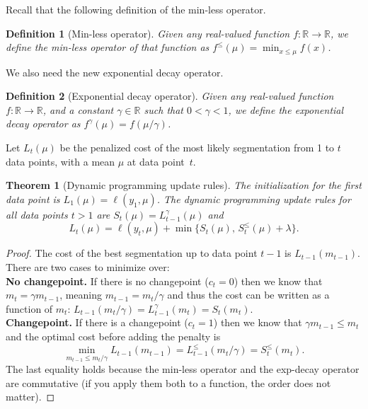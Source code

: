 \documentclass{article}
\newtheorem{theorem}{Theorem}
\newtheorem{definition}{Definition}
\newcommand{\RR}{\mathbb R}
\begin{document}
Recall that the following
definition of the min-less operator.
\begin{definition}[Min-less operator]
\label{def:min-less}
  Given any real-valued function $f:\RR\rightarrow\RR$, we define the min-less
  operator of that function as $f^\leq(\mu)=\min_{x\leq \mu} f(x)$.
\end{definition}
We also need the new exponential decay operator.
\begin{definition}[Exponential decay operator]
\label{def:exp-decay}
Given any real-valued function $f:\RR\rightarrow\RR$, and a constant
$\gamma\in\RR$ such that $0<\gamma<1$, we define the exponential decay
operator as $f^\gamma(\mu)=f(\mu/\gamma)$.
\end{definition}

Let $L_{t}(\mu)$ be the penalized cost of the most likely segmentation
from 1 to $t$ data points, with a mean $\mu$ at data point~$t$. 
\begin{theorem}[Dynamic programming update rules]
The
initialization for the first data point is
$L_{1}(\mu) = \ell(y_1, \mu)$. The dynamic programming update rules for
all data points $t>1$ are $S_{t}(\mu) = L^\gamma_{t-1}(\mu)$ and
\begin{equation}
  L_{t}(\mu) = \ell(y_t, \mu) + \min\{
   S_t(\mu),\,  
   S_t^\leq(\mu) + \lambda
  \}.
\end{equation}
\end{theorem}
\begin{proof}
  The cost of the best segmentation up to data point $t-1$ is
  $L_{t-1}(m_{t-1})$. There are two cases to minimize over:\\
  \textbf{No changepoint.} If there is no changepoint ($c_t=0$) then
  we know that $m_t = \gamma m_{t-1}$, meaning $m_{t-1}=m_t/\gamma$
  and thus the cost can be written as a function of $m_{t}$:
  $L_{t-1}(m_t/\gamma)=L_{t-1}^\gamma(m_t)=S_t(m_t)$.\\
  \textbf{Changepoint.} If there is a changepoint ($c_t=1$) then we
  know that $\gamma m_{t-1}\leq m_t$ and the optimal cost before
  adding the penalty is
  \begin{equation}
    \min_{m_{t-1}\leq m_t/\gamma} L_{t-1}(m_{t-1})=L_{t-1}^\leq(m_t/\gamma)=S_{t}^\leq(m_t).
  \end{equation}
  The last equality holds because the min-less operator and the
  exp-decay operator are commutative (if you apply them both to a
  function, the order does not matter).
\end{proof}
\end{document}
